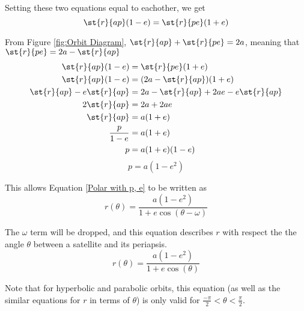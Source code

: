 \documentclass[../basicOrbitalDynamics.tex]{subfiles}
\begin{document}
Setting these two equations equal to eachother, we get
$$\st{r}{ap}(1-e)=\st{r}{pe}(1+e)$$

From Figure \ref{fig:Orbit Diagram}, $\st{r}{ap}+\st{r}{pe}=2a$, meaning that $\st{r}{pe}=2a-\st{r}{ap}$
\begin{align*}
    \st{r}{ap}(1-e)         & =\st{r}{pe}(1+e)                \\
    \st{r}{ap}(1-e)         & =(2a-\st{r}{ap})(1+e)           \\
    \st{r}{ap}-e\st{r}{ap} & =2a-\st{r}{ap}+2ae-e\st{r}{ap} \\
    2\st{r}{ap}             & =2a+2ae                          \\
    \st{r}{ap}              & =a(1+e)                          \\
    \frac{p}{1-e}            & =a(1+e)                          \\
    p                        & =a(1+e)(1-e)                     \\
\end{align*}
\begin{equation}\label{SLR a and e}
    p=a(1-e^2)
\end{equation}

This allows Equation \eqref{Polar with p, e} to be written as
\begin{equation*}
    r(\theta)=\frac{a(1-e^2)}{1+e\cos(\theta-\omega)}
\end{equation*}

The $\omega$ term will be dropped, and this equation describes $r$ with respect the the angle $\theta$ between a satellite and its periapsis.
\begin{equation}\label{Polar Final}
    r(\theta)=\frac{a(1-e^2)}{1+e\cos(\theta)}
\end{equation}

Note that for hyperbolic and parabolic orbits, this equation (as well as the similar equations for $r$ in terms of $\theta$) is only valid for $\frac{-\pi}{2}<\theta<\frac{\pi}{2}$.
\end{document}
